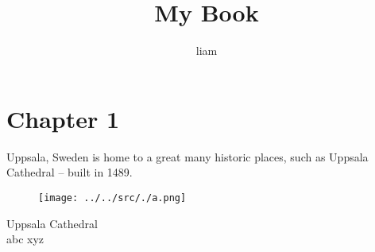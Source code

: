 \documentclass{article}
\title{My Book}
\author{liam}
\begin{document}
\maketitle
\clearpage
\tableofcontents
\clearpage

\section{Chapter 1}
\label{Chapter 1}
\label{chapter-1}

Uppsala, Sweden is home to a great many historic places, such as Uppsala Cathedral -- built in 1489.~\\

\begin{figure}
\centering
\texttt{[image: ../../src/./a.png]}
\caption{}
\end{figure}
Uppsala Cathedral~\\

abc
xyz~\\
\end{document}
